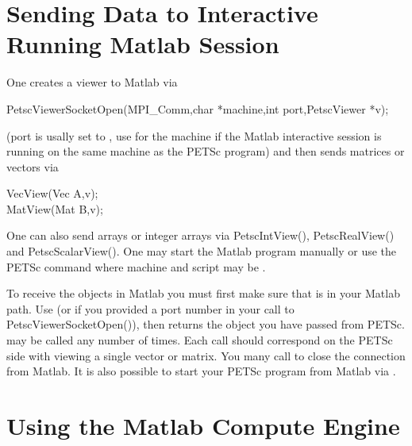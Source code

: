 \section{Sending Data to Interactive Running Matlab Session}

One creates a viewer to Matlab via 
\begin{tabbing}
PetscViewerSocketOpen(MPI\_Comm,char *machine,int port,PetscViewer *v);
\end{tabbing}
(port is usally set to , use  for the machine if the 
Matlab interactive session is running on the same machine as the PETSc program) 
and then sends matrices or vectors via
\begin{tabbing}
  VecView(Vec A,v);\\
  MatView(Mat B,v);
\end{tabbing}
One can also send arrays or integer arrays via PetscIntView(), PetscRealView() and PetscScalarView().
One may start the Matlab program manually or use the PETSc command
 where machine and script may be .

To receive the objects in Matlab you must first make sure that 
is in your Matlab path. Use  (or  if you provided a port number in
your call to PetscViewerSocketOpen()), then  returns the object you have passed from PETSc.
 may be called any number of times. Each call should correspond on the PETSc side with
viewing a single vector or matrix. You many call  to close the connection from Matlab.
It is also possible to start your PETSc program from Matlab via .

\section{Using the Matlab Compute Engine}

